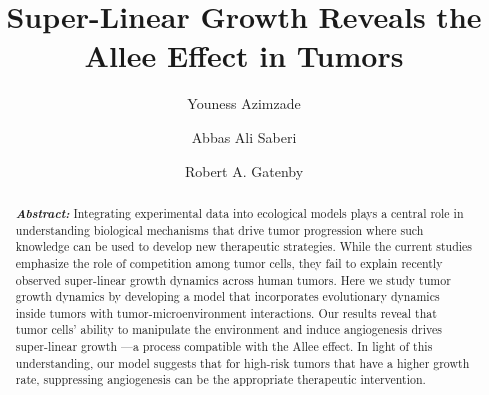 \documentclass[aps,prl, superscriptaddress,groupedaddress]{revtex4}  %
\begin{document}
	\title{Super-Linear Growth Reveals the Allee Effect in Tumors} 
	\author{Youness Azimzade} 
	
	\author{Abbas Ali Saberi} 
	
	\author{Robert A. Gatenby}
	
	\begin{abstract} 
	\textbf{\textit{Abstract:}}	Integrating experimental data into ecological models plays a central role in understanding biological mechanisms that drive tumor progression where such knowledge   can be used to develop new therapeutic strategies. While the current studies emphasize the role of competition among tumor cells, they fail to explain recently observed super-linear growth dynamics across human tumors. Here we study tumor growth dynamics by developing a model that incorporates evolutionary dynamics inside tumors with tumor-microenvironment interactions. Our results reveal that tumor cells' ability to manipulate the environment and induce angiogenesis drives super-linear growth ---a process compatible with the Allee effect. In light of this understanding, our model suggests that for high-risk tumors that have a higher growth rate, suppressing angiogenesis  can be the appropriate  therapeutic intervention.
	\end{abstract}
	\maketitle
	
\end{document}
